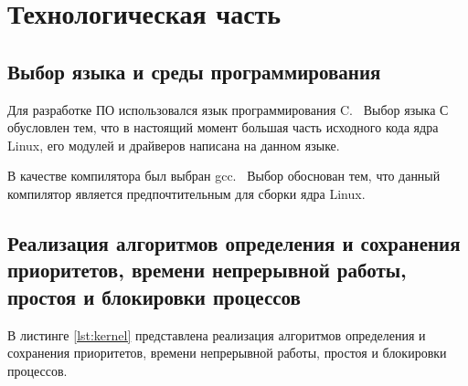 \chapter{Технологическая часть}

\section{Выбор языка и среды программирования}

Для разработке ПО использовался язык программирования C.~\cite{c} Выбор языка С обусловлен тем, что в настоящий момент большая часть исходного кода ядра Linux, его модулей и драйверов написана на данном языке.~\cite{rust_in_linux}

В качестве компилятора был выбран gcc.~\cite{gcc} Выбор обоснован тем, что данный компилятор является предпочтительным для сборки ядра Linux.~\cite{build_linux}

\section{Реализация алгоритмов определения и сохранения приоритетов, времени непрерывной работы, простоя и блокировки процессов}

В листинге \ref{lst:kernel} представлена реализация алгоритмов определения и сохранения приоритетов, времени непрерывной работы, простоя и блокировки процессов.

